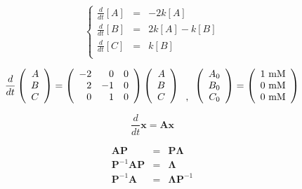 \[
\left\{
\begin{array}{lll}
\frac{d}{dt}[A] & = & - 2k [A] \\
\frac{d}{dt}[B] & = & 2k [A] - k[B]\\
\frac{d}{dt}[C] & = & k [B] \\
\end{array}
\right.
\]



\[
\frac{d}{dt}
\left(
\begin{array}{r}
A\\
B\\
C\\
\end{array}
\right)
=
\left(
\begin{array}{rrr}
-2 & 0 & 0\\
2 & -1 & 0\\
0 & 1 & 0\\
\end{array}
\right)
\left(
\begin{array}{r}
A\\
B\\
C\\
\end{array}
\right)
\begin{array}{r}
\ \\
\ \\
, \\
\end{array}
 \left(
\begin{array}{r}
A_0 \\ 
B_0 \\
C_0 \\
\end{array}
\right)
=
\left(
\begin{array}{r}
1\  {\rm mM} \\
0\  {\rm mM} \\
0\  {\rm mM} \\
\end{array}
\right)
\]


\[\frac{d}{dt}{\mathbf x} = {\mathbf A}{\mathbf x}\]


\begin{eqnarray*}
{\mathbf A}{\mathbf P} & = & {\mathbf P}{\mathbf \Lambda}\\
{\mathbf P}^{-1}{\mathbf A}{\mathbf P} & = & {\mathbf \Lambda}\\
{\mathbf P}^{-1}{\mathbf A} & = & {\mathbf \Lambda}{\mathbf P}^{-1}\\
\end{eqnarray*}

